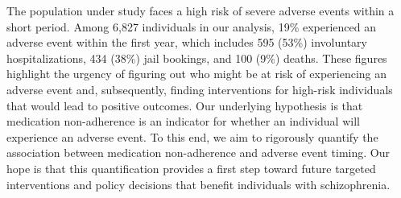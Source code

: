 The population under study faces a high risk of severe adverse events within a short period.  
Among 6,827 individuals in our analysis, 19\% experienced an adverse event within the first year, which includes 595 (53\%) involuntary hospitalizations, 434 (38\%) jail bookings, and 100 (9\%) deaths. These figures highlight the urgency of figuring out who might be at risk of experiencing an adverse event and, subsequently, finding interventions for high-risk individuals that would lead to positive outcomes. Our underlying hypothesis is that medication non-adherence is an indicator for whether an individual will experience an adverse event.
To this end, we aim to rigorously quantify the association between medication non-adherence and adverse event timing. Our hope is that this quantification provides a first step toward future targeted interventions and policy decisions that benefit individuals with schizophrenia.

